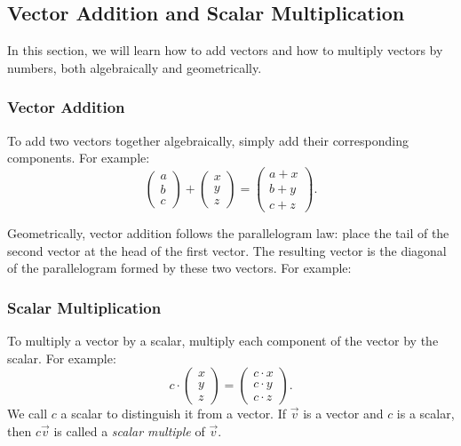 \documentclass[a4paper,12pt]{article}
\begin{document}
\subsection{Vector Addition and Scalar Multiplication}

In this section, we will learn how to add vectors and how to multiply vectors by numbers, both algebraically and geometrically.

\subsubsection{Vector Addition}
To add two vectors together algebraically, simply add their corresponding components. For example:
\[
\begin{pmatrix}
    a \\
    b \\
    c
\end{pmatrix}
+
\begin{pmatrix}
    x \\
    y \\
    z
\end{pmatrix}
=
\begin{pmatrix}
    a + x \\
    b + y \\
    c + z
\end{pmatrix}.
\]

Geometrically, vector addition follows the parallelogram law: place the tail of the second vector at the head of the first vector. The resulting vector is the diagonal of the parallelogram formed by these two vectors. For example:

\begin{center}
\end{center}

\subsubsection{Scalar Multiplication}
To multiply a vector by a scalar, multiply each component of the vector by the scalar. For example:
\[
c \cdot \begin{pmatrix}
    x \\
    y \\
    z
\end{pmatrix} = \begin{pmatrix}
    c \cdot x \\
    c \cdot y \\
    c \cdot z
\end{pmatrix}.
\]
We call $c$ a scalar to distinguish it from a vector. If $\vec{v}$ is a vector and $c$ is a scalar, then $c\vec{v}$ is called a \textit{scalar multiple} of $\vec{v}$.
\end{document}
